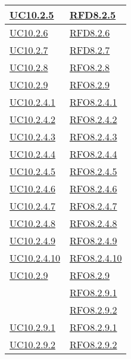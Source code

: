 \begin{longtable}{|>{\centering}m{5cm}|m{5cm}<{\centering}|}
\hyperlink{UC10.2.5}{UC10.2.5} & \hyperlink{RFD8.2.5}{RFD8.2.5}\\\hline
\hyperlink{UC10.2.6}{UC10.2.6} & \hyperlink{RFD8.2.6}{RFD8.2.6}\\\hline
\hyperlink{UC10.2.7}{UC10.2.7} & \hyperlink{RFD8.2.7}{RFD8.2.7}\\\hline
\hyperlink{UC10.2.8}{UC10.2.8} & \hyperlink{RFO8.2.8}{RFO8.2.8}\\\hline
\hyperlink{UC10.2.9}{UC10.2.9} & \hyperlink{RFO8.2.9}{RFO8.2.9}\\\hline

\hyperlink{UC10.2.4.1}{UC10.2.4.1} & \hyperlink{RFO8.2.4.1}{RFO8.2.4.1}\\\hline
\hyperlink{UC10.2.4.2}{UC10.2.4.2} & \hyperlink{RFO8.2.4.2}{RFO8.2.4.2}\\\hline
\hyperlink{UC10.2.4.3}{UC10.2.4.3} & \hyperlink{RFO8.2.4.3}{RFO8.2.4.3}\\\hline
\hyperlink{UC10.2.4.4}{UC10.2.4.4} & \hyperlink{RFO8.2.4.4}{RFO8.2.4.4}\\\hline
\hyperlink{UC10.2.4.5}{UC10.2.4.5} & \hyperlink{RFO8.2.4.5}{RFO8.2.4.5}\\\hline
\hyperlink{UC10.2.4.6}{UC10.2.4.6} & \hyperlink{RFO8.2.4.6}{RFO8.2.4.6}\\\hline
\hyperlink{UC10.2.4.7}{UC10.2.4.7} & \hyperlink{RFO8.2.4.7}{RFO8.2.4.7}\\\hline
\hyperlink{UC10.2.4.8}{UC10.2.4.8} & \hyperlink{RFO8.2.4.8}{RFO8.2.4.8}\\\hline
\hyperlink{UC10.2.4.9}{UC10.2.4.9} & \hyperlink{RFO8.2.4.9}{RFO8.2.4.9}\\\hline
\hyperlink{UC10.2.4.10}{UC10.2.4.10} & \hyperlink{RFO8.2.4.10}{RFO8.2.4.10}\\\hline

\hyperlink{UC10.2.9}{UC10.2.9}
& \hyperlink{RFO8.2.9}{RFO8.2.9}\\
& \hyperlink{RFO8.2.9.1}{RFO8.2.9.1}\\
& \hyperlink{RFO8.2.9.2}{RFO8.2.9.2}\\\hline

\hyperlink{UC10.2.9.1}{UC10.2.9.1} & \hyperlink{RFO8.2.9.1}{RFO8.2.9.1}\\\hline
\hyperlink{UC10.2.9.2}{UC10.2.9.2} & \hyperlink{RFO8.2.9.2}{RFO8.2.9.2}\\\hline


\end{longtable}
